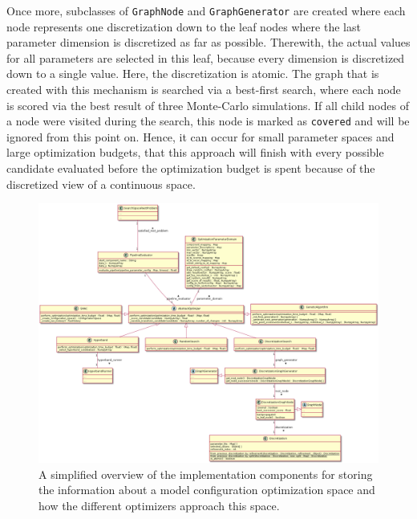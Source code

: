 \begin{itemize}
    Once more, subclasses of \texttt{GraphNode} and \texttt{GraphGenerator} are created where each node represents one discretization down to the leaf nodes where the last parameter dimension is discretized as far as possible.
    Therewith, the actual values for all parameters are selected in this leaf, because every dimension is discretized down to a single value. 
    Here, the discretization is atomic.\newline
    The graph that is created with this mechanism is searched via a best-first search, where each node is scored via the best result of three Monte-Carlo simulations.
    If all child nodes of a node were visited during the search, this node is marked as \texttt{covered} and will be ignored from this point on.
    Hence, it can occur for small parameter spaces and large optimization budgets, that this approach will finish with every possible candidate evaluated before the optimization budget is spent because of the discretized view of a continuous space.
\end{itemize}

\begin{figure}[ht!]
    \centering
    \includegraphics[angle=90,origin=c,width=\textwidth,height=0.9\textheight,keepaspectratio]{gfx/Figures/Implementation/optimization/PipelineOptimization.png}
    \caption{A simplified overview of the implementation components for storing the information about a model configuration optimization space and how the different optimizers approach this space.}
    \label{fig:implementation:uml:optimization}
\end{figure}

